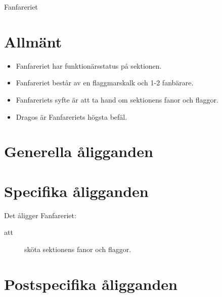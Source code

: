 \documentclass[a4paper]{article}
\begin{document}
\renewcommand{\forening}{Fanfareriet} %

\begin{foreningenv}{\forening{}} %
    \section{Allmänt}
    \begin{itemize}
        \item Fanfareriet har funktionärsstatus på sektionen.
        \item Fanfareriet består av en flaggmarskalk och 1-2 fanbärare.
        \item Fanfareriets syfte är att ta hand om sektionens fanor och flaggor.
        \item Dragos är Fanfareriets högsta befäl.
    \end{itemize}
    
    \section{Generella åligganden}
    \aliggsektfunkt{}
    
    \section{Specifika åligganden}
    Det åligger \forening{}:
    \begin{description}
        \item[att] sköta sektionens fanor och flaggor.
    \end{description}
    
    \section{Postspecifika åligganden}

\end{foreningenv}
\end{document}
